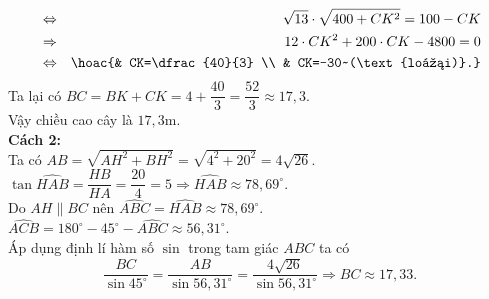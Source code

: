 \begin{bt}
{\begin{eqnarray*}
	&\Leftrightarrow & \sqrt{13}\cdot\sqrt{400+CK^2}=100-CK\\
	&\Rightarrow & 12\cdot CK^2+200\cdot CK-4800=0\\
	&\Leftrightarrow &\hoac{& CK=\dfrac{40}{3} \\ & CK=-30~(\text{loại)}.}
\end{eqnarray*}
Ta lại có $BC=BK+CK=4+\dfrac{40}{3}=\dfrac{52}{3}\approx17{,}3$.\\
Vậy chiều cao cây là $17{,}3$m.\\
\textbf{Cách 2:}\\
Ta có $AB= \sqrt{AH^2 + BH^2} = \sqrt{4^2+20^2} = 4 \sqrt{26}$.\\
$\tan \widehat{HAB} = \dfrac{HB}{HA} = \dfrac{20}{4} = 5 \Rightarrow \widehat{HAB} \approx 78{,}69^{\circ}$.\\
Do $AH \parallel BC$ nên $ \widehat{ABC} = \widehat{HAB} \approx 78{,}69^{\circ}$.\\
$\widehat{ACB} = 180^{\circ} - 45^{\circ} - \widehat{ABC} \approx 56{,}31^{\circ}$.\\
Áp dụng định lí hàm số $\sin$ trong tam giác $ABC$ ta có
$$ \dfrac{BC}{\sin 45^{\circ}} = \dfrac{AB}{\sin 56{,}31^{\circ}} = \dfrac{4 \sqrt{26}}{\sin 56{,}31^{\circ}} \Rightarrow BC \approx  17{,}33.$$
}
\end{bt}




